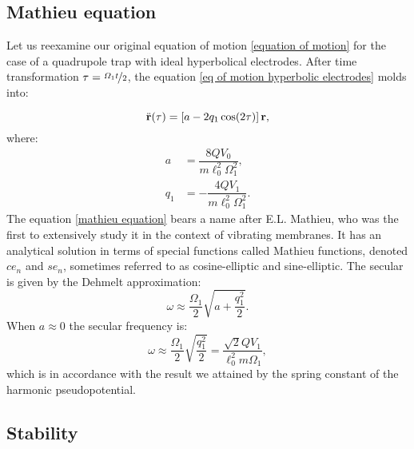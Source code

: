 \subsection{Mathieu equation}
\label{sec:mathieu equation}
Let us reexamine our original equation of motion \eqref{equation of motion} for the case of a quadrupole trap with ideal hyperbolical electrodes. After time transformation $\tau = \nicefrac{\Omega_1 t}{2}$, the equation \eqref{eq of motion hyperbolic electrodes} molds into:

\begin{equation}
	\label{mathieu equation}
	\ddot{\vb{r}}(\tau) = \left[a - 2 q_1 \cos(2 \tau)\right] \vb{r},
\end{equation}
where:
\begin{subequations}
\begin{align}
	a &= \dfrac{8 Q V_0}{m \ell_0^2 \Omega_1^2}, \\
	q_1 &= -\dfrac{4 Q V_1}{m \ell_0^2 \Omega_1^2}.
\end{align}
\end{subequations}
The equation \eqref{mathieu equation} bears a name after E.L. Mathieu, who was the first to extensively study it in the context of vibrating membranes. It has an analytical solution \cite{5416839} in terms of special functions called Mathieu functions, denoted $ce_n$ and $se_n$, sometimes referred to as cosine-elliptic and sine-elliptic. The secular is given by the Dehmelt approximation:
\begin{equation}
	\omega \approx \frac{\Omega_1}{2} \sqrt{a + \frac{q_1^2}{2}}.
\end{equation}
When $a \approx 0$ the secular frequency is:
\begin{equation}
	\omega \approx \frac{\Omega_1}{2} \sqrt{\dfrac{q_1^2}{2}} = \dfrac{\sqrt{2} Q V_1}{\ell_0^2 m \Omega_1},
\end{equation}
which is in accordance with the result we attained by the spring constant of the harmonic pseudopotential.

\subsection{Stability}

